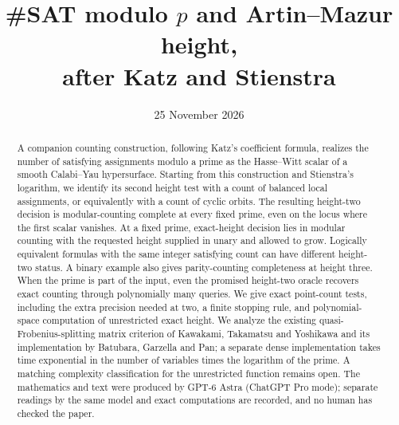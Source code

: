 \documentclass[11pt]{article}
\title{\#SAT modulo $p$ and Artin--Mazur height,\protect\\after Katz and Stienstra}
\author{}
\date{25 November 2026}
\theoremstyle{definition}
\begin{document}
\maketitle
\begin{abstract}
A companion counting construction, following Katz's coefficient formula,
realizes the number of satisfying assignments modulo a prime as the
Hasse--Witt scalar of a smooth Calabi--Yau hypersurface.
Starting from this construction and Stienstra's logarithm, we identify
its second height test with a count of balanced local assignments,
or equivalently with a count of cyclic orbits.
The resulting height-two decision is modular-counting complete at every
fixed prime, even on the locus where the first scalar vanishes.
At a fixed prime, exact-height decision lies in modular counting with
the requested height supplied in unary and allowed to grow.
Logically equivalent formulas with the same integer satisfying count
can have different height-two status. A binary example also gives
parity-counting completeness at height three. When the prime is part
of the input, even the promised height-two oracle recovers exact
counting through polynomially many queries.
We give exact point-count tests, including the extra precision needed
at two, a finite stopping rule, and polynomial-space computation of
unrestricted exact height. We analyze the existing quasi-Frobenius-splitting
matrix criterion of Kawakami, Takamatsu and Yoshikawa and its implementation
by Batubara, Garzella and Pan; a separate dense implementation takes time
exponential in the number of variables times the logarithm of the prime. A matching complexity
classification for the unrestricted function remains open.
The mathematics and text were produced by GPT-6 Astra (ChatGPT Pro mode);
separate readings by the same model and exact computations are recorded,
and no human has checked the paper.
\end{abstract}
\end{document}
